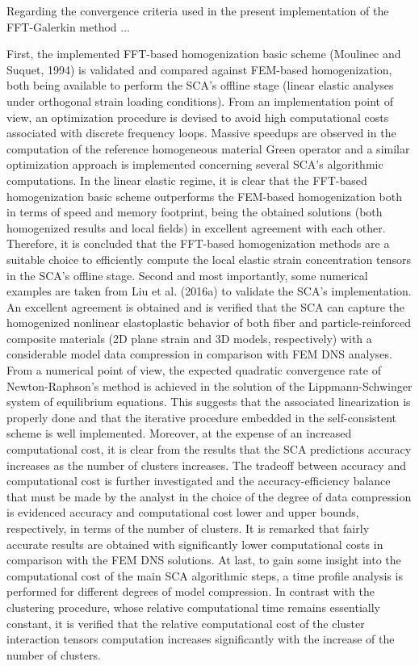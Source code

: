 Regarding the convergence criteria used in the present implementation of the FFT-Galerkin method ...


First, the implemented FFT-based homogenization basic scheme (Moulinec and Suquet, 1994) is validated and compared against FEM-based homogenization, both being available to perform the SCA's offline stage (linear elastic analyses under orthogonal strain loading conditions).
From an implementation point of view, an optimization procedure is devised to avoid high computational costs associated with discrete frequency loops.
Massive speedups are observed in the computation of the reference homogeneous material Green operator and a similar optimization approach is implemented concerning several SCA's algorithmic computations.
In the linear elastic regime, it is clear that the FFT-based homogenization basic scheme outperforms the FEM-based homogenization both in terms of speed and memory footprint, being the obtained solutions (both homogenized results and local fields) in excellent agreement with each other.
Therefore, it is concluded that the FFT-based homogenization methods are a suitable choice to efficiently compute the local elastic strain concentration tensors in the SCA's offline stage.
Second and most importantly, some numerical examples are taken from Liu et al. (2016a) to validate the SCA's implementation.
An excellent agreement is obtained and is verified that the SCA can capture the homogenized nonlinear elastoplastic behavior of both fiber and particle-reinforced composite materials (2D plane strain and \(3 \mathrm{D}\) models, respectively) with a considerable model data compression in comparison with FEM DNS analyses.
From a numerical point of view, the expected quadratic convergence rate of Newton-Raphson's method is achieved in the solution of the Lippmann-Schwinger system of equilibrium equations.
This suggests that the associated linearization is properly done and that the iterative procedure embedded in the self-consistent scheme is well implemented.
Moreover, at the expense of an increased computational cost, it is clear from the results that the SCA predictions accuracy increases as the number of clusters increases.
The tradeoff between accuracy and computational cost is further investigated and the accuracy-efficiency balance that must be made by the analyst in the choice of the degree of data compression is evidenced accuracy and computational cost lower and upper bounds, respectively, in terms of the number of clusters.
It is remarked that fairly accurate results are obtained with significantly lower computational costs in comparison with the FEM DNS solutions.
At last, to gain some insight into the computational cost of the main SCA algorithmic steps, a time profile analysis is performed for different degrees of model compression.
In contrast with the clustering procedure, whose relative computational time remains essentially constant, it is verified that the relative computational cost of the cluster interaction tensors computation increases significantly with the increase of the number of clusters.

